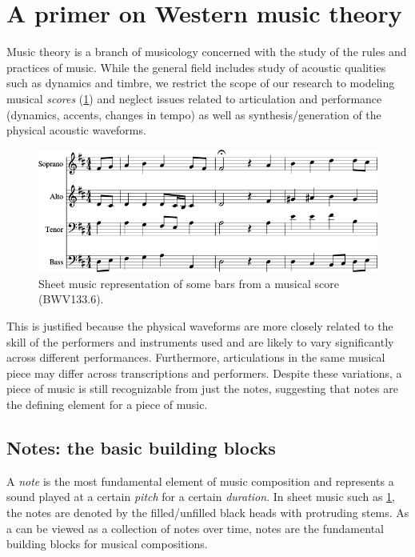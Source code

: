 \section{A primer on Western music theory}

Music theory is a branch of musicology concerned with the study of the rules
and practices of music. While the general field includes study of acoustic
qualities such as dynamics and timbre, we restrict the scope of our research to
modeling musical \emph{scores} (\eg \cref{fig:eg-score}) and neglect issues
related to articulation and performance (\eg dynamics, accents, changes in
tempo) as well as synthesis/generation of the physical acoustic waveforms.

\begin{figure}[htbp]
    \centering
    \includegraphics[width=0.8\linewidth]{bwv133-6-original-score-1.png}
    \caption{Sheet music representation of some bars from a musical score (BWV133.6).}
    \label{fig:eg-score}
\end{figure}

This is justified because the physical waveforms are more closely related
to the skill of the performers and instruments used and are likely to vary
significantly across different performances. Furthermore, articulations in
the same musical piece may differ across transcriptions and performers.
Despite these variations, a piece of music is still recognizable from just the
notes, suggesting that notes are the defining element for a piece of music.

\subsection{Notes: the basic building blocks}

A \emph{note} is the most fundamental element of music composition and
represents a sound played at a certain \emph{pitch} for a certain
\emph{duration}. In sheet music such as \cref{fig:eg-score}, the notes are
denoted by the filled/unfilled black heads with protruding stems. As a can be
viewed as a collection of notes over time, notes are the fundamental building
blocks for musical compositions.

